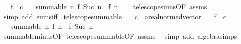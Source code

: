 \begin{isabellebody}
\ \ \ {\isachardoublequoteopen}f\ {\isasymlonglonglongrightarrow}\ c{\isachardoublequoteclose}\isanewline
\ \ \ {\isachardoublequoteopen}summable\ {\isacharparenleft}{\kern0pt}{\isasymlambda}n{\isachardot}{\kern0pt}\ f\ {\isacharparenleft}{\kern0pt}Suc\ n{\isacharparenright}{\kern0pt}\ {\isacharminus}{\kern0pt}\ f\ n{\isacharparenright}{\kern0pt}{\isachardoublequoteclose}\isanewline
%
\isadelimproof
\ \ %
\endisadelimproof
%
\isatagproof
{}\isamarkupfalse%
\ telescope{\isacharunderscore}{\kern0pt}sums{\isacharbrackleft}{\kern0pt}OF\ assms{\isacharbrackright}{\kern0pt}\ \isamarkupfalse%
\ {\isacharparenleft}{\kern0pt}simp\ add{\isacharcolon}{\kern0pt}\ sums{\isacharunderscore}{\kern0pt}iff{\isacharparenright}{\kern0pt}%
\endisatagproof
{\isafoldproof}%
%
\isadelimproof
\isanewline
%
\endisadelimproof
\isanewline
{}\isamarkupfalse%
\ telescope{\isacharunderscore}{\kern0pt}summable{\isacharprime}{\kern0pt}{\isacharcolon}{\kern0pt}\isanewline
\ \ \ c\ {\isacharcolon}{\kern0pt}{\isacharcolon}{\kern0pt}\ {\isachardoublequoteopen}{\isacharprime}{\kern0pt}a{\isacharcolon}{\kern0pt}{\isacharcolon}{\kern0pt}real{\isacharunderscore}{\kern0pt}normed{\isacharunderscore}{\kern0pt}vector{\isachardoublequoteclose}\isanewline
\ \ \ {\isachardoublequoteopen}f\ {\isasymlonglonglongrightarrow}\ c{\isachardoublequoteclose}\isanewline
\ \ \ {\isachardoublequoteopen}summable\ {\isacharparenleft}{\kern0pt}{\isasymlambda}n{\isachardot}{\kern0pt}\ f\ n\ {\isacharminus}{\kern0pt}\ f\ {\isacharparenleft}{\kern0pt}Suc\ n{\isacharparenright}{\kern0pt}{\isacharparenright}{\kern0pt}{\isachardoublequoteclose}\isanewline
%
\isadelimproof
\ \ %
\endisadelimproof
%
\isatagproof
{}\isamarkupfalse%
\ summable{\isacharunderscore}{\kern0pt}minus{\isacharbrackleft}{\kern0pt}OF\ telescope{\isacharunderscore}{\kern0pt}summable{\isacharbrackleft}{\kern0pt}OF\ assms{\isacharbrackright}{\kern0pt}{\isacharbrackright}{\kern0pt}\ \isamarkupfalse%
\ {\isacharparenleft}{\kern0pt}simp\ add{\isacharcolon}{\kern0pt}\ algebra{\isacharunderscore}{\kern0pt}simps{\isacharparenright}{\kern0pt}%
\endisatagproof
{\isafoldproof}%
%
\isadelimproof
%
\endisadelimproof
%
\isadelimdocument
%
\endisadelimdocument
%
\isatagdocument
%
\isamarkuptrue%
%
\endisatagdocument
{\isafolddocument}%
%
\isadelimdocument
%
\endisadelimdocument
%
\begin{isamarkuptext}%

\end{isamarkuptext}
\end{isabellebody}
